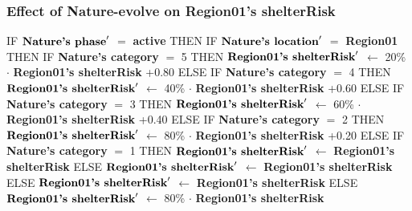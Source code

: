 \documentclass{article}%
\begin{document}
\subsubsection{Effect of Nature{-}evolve on Region01's shelterRisk}%
\label{ssubsec:Effect of Nature{-}evolve on Region01's shelterRisk}%
\begin{flushleft}%
IF %
$\mbox{\textbf{Nature's phase}} '$%
$=$%
\textbf{active}%
\linebreak%
\hspace*{2em}%
THEN %
IF %
$\mbox{\textbf{Nature's location}} '$%
$=$%
\textbf{Region01}%
\linebreak%
\hspace*{4em}%
THEN %
IF %
\textbf{Nature's category}%
$=$%
5%
\linebreak%
\hspace*{6em}%
THEN %
$\mbox{\textbf{Region01's shelterRisk}} '$%
$\leftarrow$%
20\%%
$\cdot$%
\textbf{Region01's shelterRisk}%
+0.80%
\linebreak%
\hspace*{6em}%
ELSE %
IF %
\textbf{Nature's category}%
$=$%
4%
\linebreak%
\hspace*{8em}%
THEN %
$\mbox{\textbf{Region01's shelterRisk}} '$%
$\leftarrow$%
40\%%
$\cdot$%
\textbf{Region01's shelterRisk}%
+0.60%
\linebreak%
\hspace*{8em}%
ELSE %
IF %
\textbf{Nature's category}%
$=$%
3%
\linebreak%
\hspace*{10em}%
THEN %
$\mbox{\textbf{Region01's shelterRisk}} '$%
$\leftarrow$%
60\%%
$\cdot$%
\textbf{Region01's shelterRisk}%
+0.40%
\linebreak%
\hspace*{10em}%
ELSE %
IF %
\textbf{Nature's category}%
$=$%
2%
\linebreak%
\hspace*{12em}%
THEN %
$\mbox{\textbf{Region01's shelterRisk}} '$%
$\leftarrow$%
80\%%
$\cdot$%
\textbf{Region01's shelterRisk}%
+0.20%
\linebreak%
\hspace*{12em}%
ELSE %
IF %
\textbf{Nature's category}%
$=$%
1%
\linebreak%
\hspace*{14em}%
THEN %
$\mbox{\textbf{Region01's shelterRisk}} '$%
$\leftarrow$%
\textbf{Region01's shelterRisk}%
\linebreak%
\hspace*{14em}%
ELSE %
$\mbox{\textbf{Region01's shelterRisk}} '$%
$\leftarrow$%
\textbf{Region01's shelterRisk}%
\linebreak%
\hspace*{4em}%
ELSE %
$\mbox{\textbf{Region01's shelterRisk}} '$%
$\leftarrow$%
\textbf{Region01's shelterRisk}%
\linebreak%
\hspace*{2em}%
ELSE %
$\mbox{\textbf{Region01's shelterRisk}} '$%
$\leftarrow$%
80\%%
$\cdot$%
\textbf{Region01's shelterRisk}%
\end{flushleft}
\end{document}
